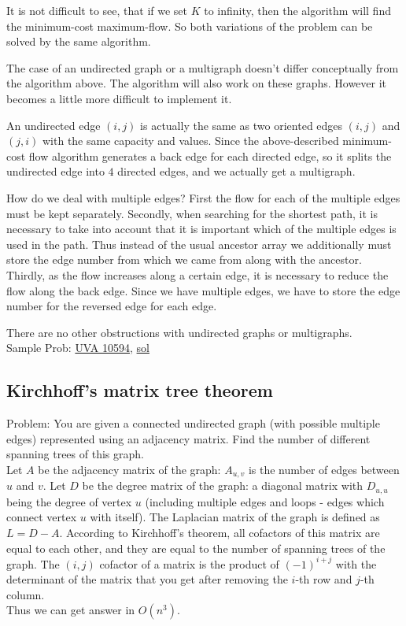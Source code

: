 \documentclass[8pt, a4paper, oneside, twocolumn]{extarticle}
\begin{document}
It is not difficult to see, that if we set $K$ to infinity, then the algorithm will find the minimum-cost maximum-flow. So both variations of the problem can be solved by the same algorithm.

The case of an undirected graph or a multigraph doesn't differ conceptually from the algorithm above. The algorithm will also work on these graphs. However it becomes a little more difficult to implement it.

An undirected edge $(i, j)$ is actually the same as two oriented edges $(i, j)$ and $(j, i)$ with the same capacity and values. Since the above-described minimum-cost flow algorithm generates a back edge for each directed edge, so it splits the undirected edge into $4$ directed edges, and we actually get a multigraph.

How do we deal with multiple edges? First the flow for each of the multiple edges must be kept separately. Secondly, when searching for the shortest path, it is necessary to take into account that it is important which of the multiple edges is used in the path. Thus instead of the usual ancestor array we additionally must store the edge number from which we came from along with the ancestor. Thirdly, as the flow increases along a certain edge, it is necessary to reduce the flow along the back edge. Since we have multiple edges, we have to store the edge number for the reversed edge for each edge.

There are no other obstructions with undirected graphs or multigraphs.
\\Sample Prob: \href{https://uva.onlinejudge.org/external/105/10594.pdf}{UVA 10594}, \href{https://github.com/sourabh2311/Competitive-Programming/blob/master/UVA_10594_Better.cpp}{sol}
\subsection{Kirchhoff's matrix tree theorem}
Problem: You are given a connected undirected graph (with possible multiple edges) represented using an adjacency matrix. Find the number of different spanning trees of this graph.
\\Let $A$ be the adjacency matrix of the graph: $A_{u,v}$ is the number of edges between $u$ and $v$. Let $D$ be the degree matrix of the graph: a diagonal matrix with $D_{u,u}$ being the degree of vertex $u$ (including multiple edges and loops - edges which connect vertex $u$ with itself).
The Laplacian matrix of the graph is defined as $L = D - A$. According to Kirchhoff's theorem, all cofactors of this matrix are equal to each other, and they are equal to the number of spanning trees of the graph. The $(i,j)$ cofactor of a matrix is the product of $(-1)^{i + j}$ with the determinant of the matrix that you get after removing the $i$-th row and $j$-th column.\\ Thus we can get answer in $O(n^3)$.
\end{document}
